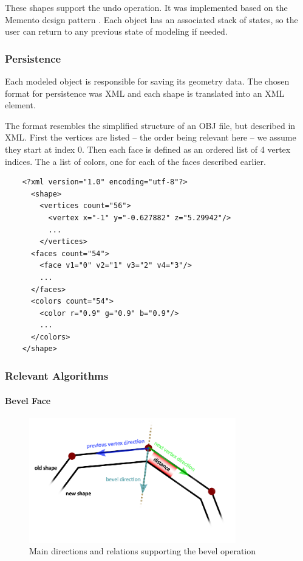 These shapes support the undo operation. It was implemented based on the Memento design pattern \cite{despat}.
Each object has an associated stack of states, so the user can return to any previous state of modeling if needed.


\subsubsection{Persistence}

Each modeled object is responsible for saving its geometry data.
The chosen format for persistence was XML and each shape is translated into an XML element.

The format resembles the simplified structure of an OBJ file, but described in XML.
First the vertices are listed -- the order being relevant here -- we assume they start at index 0.
Then each face is defined as an ordered list of 4 vertex indices.
The a list of colors, one for each of the faces described earlier.

\begin{small}
	\begin{verbatim}
	<?xml version="1.0" encoding="utf-8"?>
	  <shape>
	    <vertices count="56">
	      <vertex x="-1" y="-0.627882" z="5.29942"/>
	      ...
	    </vertices>
	  <faces count="54">
	    <face v1="0" v2="1" v3="2" v4="3"/>
	    ...
	  </faces>
	  <colors count="54">
	    <color r="0.9" g="0.9" b="0.9"/>
	    ...
	  </colors>
	</shape>
	\end{verbatim}
\end{small}


\subsubsection{Relevant Algorithms}

\paragraph{Bevel Face}

\begin{figure}[!ht]
    \centering
    \includegraphics[width=9cm]{gfx/bevel.png}
    \caption{Main directions and relations supporting the bevel operation}
    \label{FIG-GS-BEVEL}
\end{figure}


